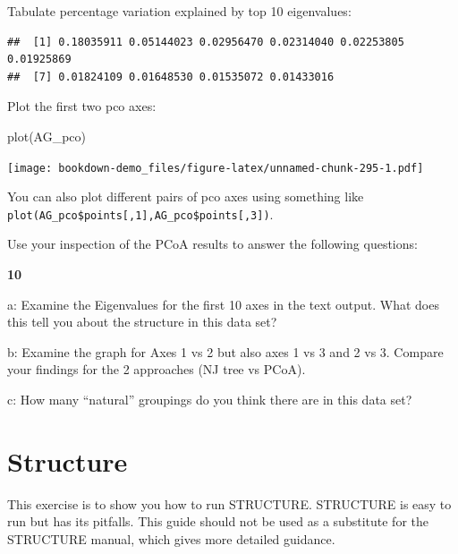 \documentclass[
]{book}
\makeatletter
\newenvironment{Shaded}{\begin{snugshade}}{\end{snugshade}}
\newcommand{\DecValTok}[1]{\textcolor[rgb]{0.00,0.00,0.81}{#1}}
\newcommand{\FunctionTok}[1]{\textcolor[rgb]{0.00,0.00,0.00}{#1}}
\newcommand{\NormalTok}[1]{#1}
\newcommand{\OtherTok}[1]{\textcolor[rgb]{0.56,0.35,0.01}{#1}}
\newcommand{\SpecialCharTok}[1]{\textcolor[rgb]{0.00,0.00,0.00}{#1}}
\newenvironment{kframe}{%
\medskip{}
\setlength{\fboxsep}{.8em}
 \def\at@end@of@kframe{}%
 \ifinner\ifhmode%
  \def\at@end@of@kframe{\end{minipage}}%
  \begin{minipage}{\columnwidth}%
 \fi\fi%
 \def\FrameCommand##1{\hskip\@totalleftmargin \hskip-\fboxsep
 \colorbox{shadecolor}{##1}\hskip-\fboxsep
     \hskip-\linewidth \hskip-\@totalleftmargin \hskip\columnwidth}%
 \MakeFramed {\advance\hsize-\width
   \@totalleftmargin\z@ \linewidth\hsize
   \@setminipage}}%
 {\par\unskip\endMakeFramed%
 \at@end@of@kframe}
\newenvironment{rmdblock}[1]
  {
  \begin{itemize}
  \renewcommand{\labelitemi}{
    \raisebox{-.7\height}[0pt][0pt]{
      {\setkeys{Gin}{width=3em,keepaspectratio}\texttt{[image: images/\#1]}}
    }
  }
  \setlength{\fboxsep}{1em}
  \begin{kframe}
  \item
  }
  {
  \end{kframe}
  \end{itemize}
  }
\newenvironment{rmdquiz}
  {\begin{rmdblock}{quiz}}
  {\end{rmdblock}}
\makeatother
\begin{document}
Tabulate percentage variation explained by top 10 eigenvalues:

\begin{Shaded}
\end{Shaded}

\begin{verbatim}
##  [1] 0.18035911 0.05144023 0.02956470 0.02314040 0.02253805 0.01925869
##  [7] 0.01824109 0.01648530 0.01535072 0.01433016
\end{verbatim}

Plot the first two pco axes:

\begin{Shaded}
\begin{Highlighting}[]
\FunctionTok{plot}\NormalTok{(AG\_pco)}
\end{Highlighting}
\end{Shaded}

\texttt{[image: bookdown-demo\_files/figure-latex/unnamed-chunk-295-1.pdf]}

You can also plot different pairs of pco axes using something like \texttt{plot(AG\_pco\$points{[},1{]},AG\_pco\$points{[},3{]})}.

Use your inspection of the PCoA results to answer the following questions:

\begin{rmdquiz}
\textbf{10}

a: Examine the Eigenvalues for the first 10 axes in the text output. What does this tell you about the structure in this data set?

b: Examine the graph for Axes 1 vs 2 but also axes 1 vs 3 and 2 vs 3. Compare your findings for the 2 approaches (NJ tree vs PCoA).

c: How many ``natural'' groupings do you think there are in this data set?
\end{rmdquiz}

\hypertarget{structure}{%
\section{Structure}\label{structure}}

This exercise is to show you how to run STRUCTURE. STRUCTURE is easy to run but has its pitfalls. This guide should not be used as a substitute for the STRUCTURE manual, which gives more detailed guidance.
\end{document}
